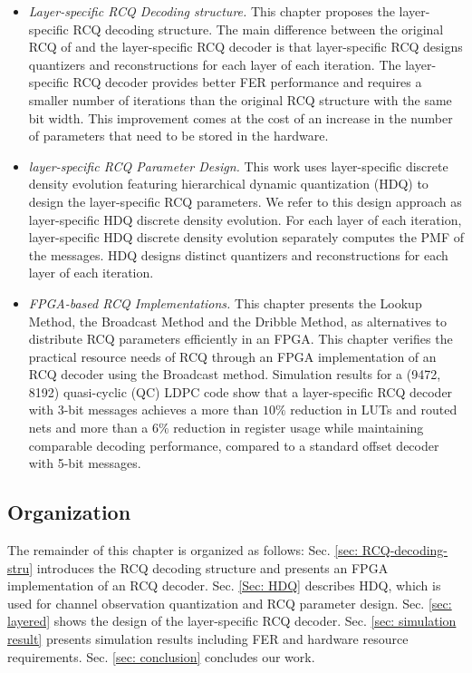 \documentclass [PhD] {uclathes}
\begin{document}
\begin{itemize}
    \item \textit{Layer-specific RCQ Decoding structure.} This chapter proposes the layer-specific RCQ decoding structure. The main difference between the original RCQ of  \cite{Wang2020-RCQ} and the layer-specific RCQ decoder is that layer-specific RCQ designs quantizers and reconstructions for each layer of each iteration. The layer-specific RCQ decoder provides better FER performance and requires a smaller number of iterations than the original RCQ structure with the same bit width. This improvement comes at the cost of an increase in the number of parameters that need to be stored in the hardware.  
    \item \textit{layer-specific RCQ Parameter Design.}
    This work uses layer-specific discrete density evolution featuring hierarchical dynamic quantization (HDQ) to design the layer-specific RCQ parameters.  We refer to this design approach as layer-specific HDQ discrete density evolution. For each layer of each iteration, layer-specific HDQ discrete density evolution separately computes the PMF of the messages. HDQ designs distinct quantizers and reconstructions for each layer of each iteration.
    \item \textit{FPGA-based RCQ Implementations.} This chapter presents the Lookup Method, the Broadcast Method and the Dribble Method, as alternatives to distribute RCQ parameters efficiently in an FPGA. This chapter verifies the practical resource needs of RCQ through an FPGA implementation of an RCQ decoder using the Broadcast method.  Simulation results for a (9472, 8192) quasi-cyclic (QC) LDPC code show that a layer-specific \minsum RCQ decoder with 3-bit messages achieves a more than $10\%$ reduction in LUTs and routed nets and more than a $6\%$ reduction in register usage while maintaining comparable decoding performance, compared to a standard offset \minsum decoder with 5-bit messages.
 \end{itemize}
\subsection{Organization}
The remainder of this chapter is organized as follows: Sec. \ref{sec: RCQ-decoding-stru} introduces the RCQ decoding structure and presents an FPGA implementation of an RCQ decoder. Sec. \ref{Sec: HDQ} describes HDQ, which is used for channel observation quantization and RCQ parameter design. Sec. \ref{sec: layered} shows the design of the layer-specific RCQ decoder. Sec.  \ref{sec: simulation result} presents simulation results including FER and hardware resource requirements. Sec. \ref{sec: conclusion} concludes our work.
\end{document}
